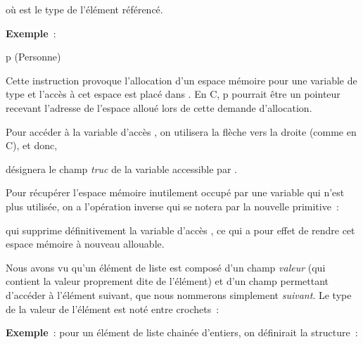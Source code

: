	où  est le type de l'élément référencé. 

	\textbf{Exemple}~: 
	\begin{pseudo}
		\Decl p \Gets \Alloc(Personne)
	\end{pseudo}
	
	Cette instruction provoque l'allocation d'un espace mémoire pour
	une variable de type  et l'accès à 
	cet espace est placé dans . 
	En C, p pourrait être un pointeur recevant
	l'adresse de l'espace alloué lors de cette demande d'allocation.

	Pour accéder à la variable d'accès , 
	on utilisera la flèche vers la droite (comme en C), et donc,
	\cadre{
		\begin{pseudo}
			\Stmt p\Gives truc
		\end{pseudo}
	}
	
	désignera le champ \textit{truc} de la variable accessible par .

	
	Pour récupérer l'espace mémoire inutilement occupé par une variable 
	qui n'est plus utilisée, on a l'opération inverse
	qui se notera par la nouvelle primitive~:

	
	qui supprime définitivement la variable d'accès , 
	ce qui a pour effet de rendre cet espace mémoire à nouveau
	allouable.

	Nous avons vu qu'un élément de liste est composé d'un champ \textit{valeur} 
	(qui contient la valeur proprement dite de
	l'élément) et d'un champ permettant d'accéder à l'élément suivant, 
	que nous nommerons simplement \textit{suivant}. Le
	type  de la valeur de l'élément est noté entre crochets~:
	
	
	\textbf{Exemple}~: pour un élément de liste chainée d'entiers, on définirait la structure~:
	
	
